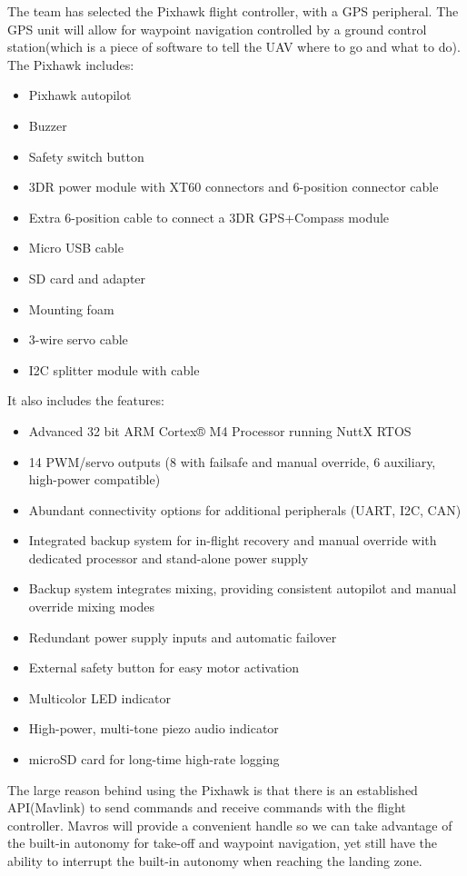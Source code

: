 \noindent The team has selected the Pixhawk flight controller, with a GPS peripheral. The GPS unit will allow for waypoint navigation controlled by a ground control station(which is a piece of software to tell the UAV where to go and what to do). The Pixhawk includes:
\begin{itemize}
\item Pixhawk autopilot
\item Buzzer
\item Safety switch button
\item 3DR power module with XT60 connectors and 6-position connector cable
\item Extra 6-position cable to connect a 3DR GPS+Compass module
\item Micro USB cable
\item SD card and adapter
\item Mounting foam
\item 3-wire servo cable
\item I2C splitter module with cable
\end{itemize}
It also includes the features:
\begin{itemize}
\item Advanced 32 bit ARM Cortex® M4 Processor running NuttX RTOS
\item 14 PWM/servo outputs (8 with failsafe and manual override, 6 auxiliary, high-power compatible)
\item Abundant connectivity options for additional peripherals (UART, I2C, CAN)
\item Integrated backup system for in-flight recovery and manual override with dedicated processor and stand-alone power supply
\item Backup system integrates mixing, providing consistent autopilot and manual override mixing modes
\item Redundant power supply inputs and automatic failover
\item External safety button for easy motor activation
\item Multicolor LED indicator
\item High-power, multi-tone piezo audio indicator
\item microSD card for long-time high-rate logging
\end{itemize}

\noindent The large reason behind using the Pixhawk is that there is an established API(Mavlink) to send commands and receive commands with the flight controller. Mavros will provide a convenient handle so we can take advantage of the built-in autonomy for take-off and waypoint navigation, yet still have the ability to interrupt the built-in autonomy when reaching the landing zone. 

